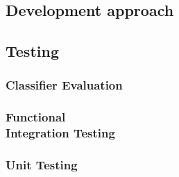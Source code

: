 \subsection{Development approach}

\subsection{Testing}
\subsubsection{Classifier Evaluation}
\subsubsection{Functional\\Integration Testing}
\subsubsection{Unit Testing}
